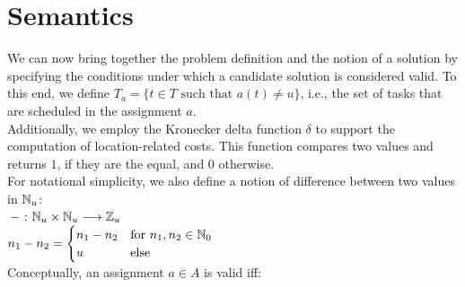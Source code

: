 \section{Semantics}
\label{sec:formal-framework:semantics}
We can now bring together the problem definition and the notion of a solution by specifying the conditions under which a candidate solution is considered valid. To this end, we define $T_a = \{ t \in T \text{ such that } a(t) \neq u \}$, i.e., the set of tasks that are scheduled in the assignment $a$. \\
Additionally, we employ the Kronecker delta function $\delta$ to support the computation of location-related costs. This function compares two values and returns $1$, if they are the equal, and $0$ otherwise. \\
For notational simplicity, we also define a notion of difference between two values in $\mathbb{N}_u$:\\
${}-{} \colon \mathbb{N}_u \times \mathbb{N}_u \longrightarrow \mathbb{Z}_u$ \\
$n_1 - n_2 = \begin{cases} n_1 - n_2 & \text{for }n_1, n_2 \in \mathbb{N}_0 \\ u & \text{else}\end{cases}$ \\
Conceptually, an assignment $a \in A$ is valid iff:
